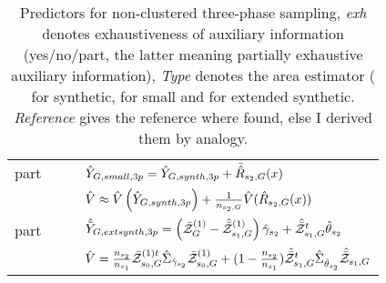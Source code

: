 \begin{table}
\begin{tabular}{ l l r l}
part 	&  \psmall{} 	& \cite[eq. 22a]{hill2017} & $\hat{Y}_{G,small,3p} = \hat{Y}_{G,synth,3p} + \bar{\hat{R}}_{s_2,G}(x)$\\
            &      	& \cite[eq. 23a]{hill2017} & $\hat{V} \approx \hat{V}\left(\hat{Y}_{G,synth,3p}\right) + \frac{1}{n_{s_2,G}}\hat{V}(\hat{R}_{s_2,G}(x))$ \\
\lightrule

part 	&  \pextended{} 	& \analogy{} & $\hat{\tilde{Y}}_{G,ext synth,3p} = \left( \bar{\mathcal{Z}}_{G}^{(1)}- \hat{\bar{\mathcal{Z}}}_{s_1,G}^{(1)}\right) \hat{\gamma}_{s_2} + \hat{\bar{\mathcal{Z}}}^t_{s_1,G}\hat{\theta}_{s_2}$\\
	   	&    	&    \analogy{} & $\hat{V} = \frac{n_{s_2}}{n_{s_1}} \bar{\mathcal{Z}}^{(1)t}_{s_0,G} \hat{\Sigma}_{ \hat{\gamma}_{s_2}} \bar{\mathcal{Z}}^{(1)}_{s_0,G} + (1-\frac{n_{s_2}}{n_{s_1}})\hat{\bar{\mathcal{Z}}}^{t}_{s_1,G} \hat{\Sigma}_{ \hat{\theta}_{s_2}} \hat{\bar{\mathcal{Z}}}_{s_1,G} $\\

\end{tabular}
\caption{Predictors for non-clustered three-phase sampling, 
    \emph{exh} denotes exhaustiveness of auxiliary information (yes/no/part, the
    latter meaning partially exhaustive auxiliary information),
    \emph{Type} denotes the area estimator (\psynthetic{} for synthetic, \psmall{}
    for small and \pextended{} for extended synthetic. \emph{Reference} gives the
    refenerce where found, else I derived them by analogy. \label{tab:unclustered3}
}
\end{table}

